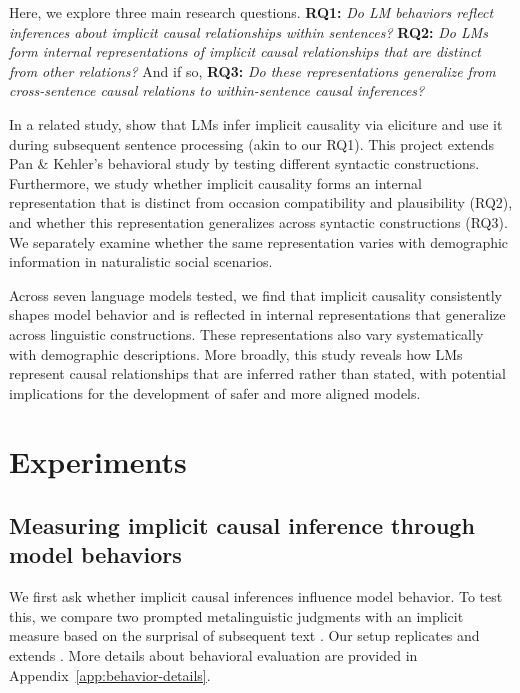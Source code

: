 \documentclass{article}
\begin{document}
Here, we explore three main research questions. \textbf{RQ1:} \textit{Do LM behaviors reflect inferences about implicit causal relationships within sentences?} \textbf{RQ2:} \textit{Do LMs form internal representations of implicit causal relationships that are distinct from other relations?} And if so, \textbf{RQ3:} \textit{Do these representations generalize from cross-sentence causal relations to within-sentence causal inferences?}

In a related study, \citet{pan-kehler-2025-pragmatic} show that LMs infer implicit causality via eliciture and use it during subsequent sentence processing (akin to our RQ1). This project extends Pan \& Kehler's behavioral study by testing different syntactic constructions. Furthermore, we study whether implicit causality forms an internal representation that is distinct from occasion compatibility and plausibility (RQ2), and whether this representation generalizes across syntactic constructions (RQ3). We separately examine whether the same representation varies with demographic information in naturalistic social scenarios.

Across seven language models tested, we find that implicit causality consistently shapes model behavior and is reflected in internal representations that generalize across linguistic constructions. These representations also vary systematically with demographic descriptions. More broadly, this study reveals how LMs represent causal relationships that are inferred rather than stated,
with potential implications for the development of safer and more aligned models.

\section{Experiments}
\label{sec:experiments}

\subsection{Measuring implicit causal inference through model behaviors}
\label{sec:behavior}
We first ask whether implicit causal inferences influence model behavior. To test this, we compare two prompted metalinguistic judgments with an implicit measure based on the surprisal of subsequent text \citep{hu-levy-2023-prompting}. Our setup replicates and extends \citet{pan-kehler-2025-pragmatic}. More details about behavioral evaluation are provided in Appendix~\ref{app:behavior-details}.
\end{document}
